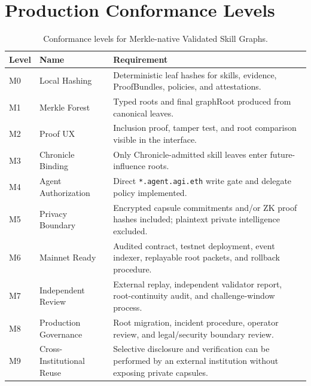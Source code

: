 \documentclass[11pt,letterpaper]{article}
\begin{document}
\section{Production Conformance Levels}
\begin{table}[H]
\small
\centering
\begin{tabularx}{\textwidth}{p{0.65in}p{1.5in}Y}
\toprule
Level & Name & Requirement\\
\midrule
M0 & Local Hashing & Deterministic leaf hashes for skills, evidence, ProofBundles, policies, and attestations.\\
M1 & Merkle Forest & Typed roots and final graphRoot produced from canonical leaves.\\
M2 & Proof UX & Inclusion proof, tamper test, and root comparison visible in the interface.\\
M3 & Chronicle Binding & Only Chronicle-admitted skill leaves enter future-influence roots.\\
M4 & Agent Authorization & Direct \texttt{*.agent.agi.eth} write gate and delegate policy implemented.\\
M5 & Privacy Boundary & Encrypted capsule commitments and/or ZK proof hashes included; plaintext private intelligence excluded.\\
M6 & Mainnet Ready & Audited contract, testnet deployment, event indexer, replayable root packets, and rollback procedure.\\
M7 & Independent Review & External replay, independent validator report, root-continuity audit, and challenge-window process.\\
M8 & Production Governance & Root migration, incident procedure, operator review, and legal/security boundary review.\\
M9 & Cross-Institutional Reuse & Selective disclosure and verification can be performed by an external institution without exposing private capsules.\\
\bottomrule
\end{tabularx}
\caption{Conformance levels for Merkle-native Validated Skill Graphs.}
\end{table}
\end{document}
